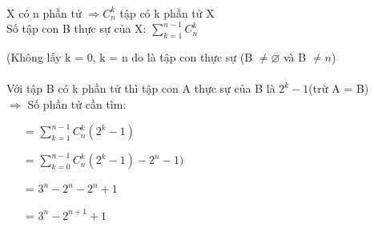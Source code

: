 \documentclass[12pt,oneside]{book}
\begin{document}
\\
\indent X có n phần tử $\Rightarrow C_n^k$ tập có k phần tử X 
\\ Số tập con B thực sự của X: $\displaystyle\sum_{k=1}^{n-1}C_n^k$

(Không lấy k = 0, k = n do là tập con thực sự (B $\ne \varnothing$ và B $\ne n$)
\\
\\
Với tập B có k phần tử thì tập con A thực sự của B là $2^k-1$(trừ A = B)
\\
$\Rightarrow$ Số phần tử cần tìm:\\
\begin{center}
\begin{itemize}
    \item[=] $\displaystyle\sum_{k=1}^{n-1}C_n^k(2^k-1)$
    \item[=] $\displaystyle\sum_{k=0}^{n-1}C_n^k(2^k-1) - 2^n -1)$
    \item[=] $3^n-2^n-2^n+1$
    \item[=] $3^n-2^{n+1}+1 $
\end{itemize}
\end{center}
\end{document}
